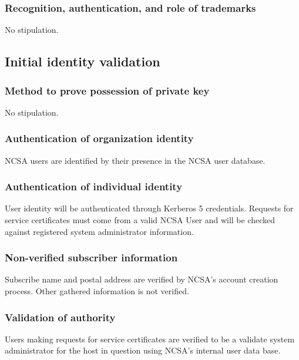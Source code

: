 \documentclass[10pt]{article}
\begin{document}
\subsubsection{Recognition, authentication, and role of trademarks}

No stipulation.

\subsection{Initial identity validation}

\subsubsection{Method to prove possession of private key}

No stipulation.

\subsubsection{Authentication of organization identity}

NCSA users are identified by their presence in the NCSA user database.

\subsubsection{Authentication of individual identity}

User identity will be authenticated through Kerberos 5
credentials. Requests for service certificates must come from a valid
NCSA User and will be checked against registered system administrator
information.

\subsubsection{Non-verified subscriber information}

Subscribe name and postal address are verified by NCSA's account
creation process. Other gathered information is not verified.

\subsubsection{Validation of authority}

Users making requests for service certificates are verified to be a
validate system administrator for the host in question using NCSA's
internal user data base.
\end{document}
